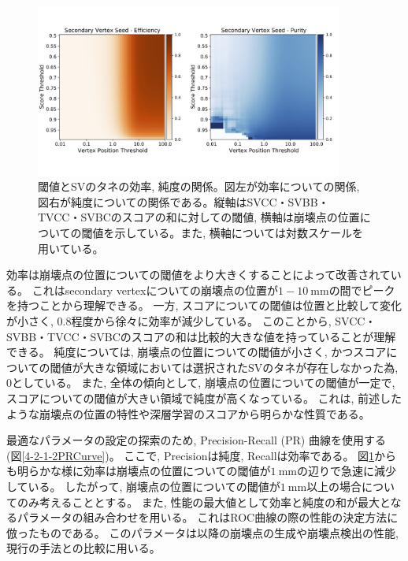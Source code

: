 \begin{figure}[htbp]
 \centering
 \includegraphics[width=0.9\textwidth, clip]{Figure/4VertexFinderwithDL/4-2-1-1SVSeed.png}
 \caption[閾値とSVのタネの効率, 純度の関係]{閾値とSVのタネの効率, 純度の関係。図左が効率についての関係, 図右が純度についての関係である。縦軸はSVCC・SVBB・TVCC・SVBCのスコアの和に対しての閾値, 横軸は崩壊点の位置についての閾値を示している。また, 横軸については対数スケールを用いている。}
 \label{4-2-1-1SVSeed}
\end{figure}

効率は崩壊点の位置についての閾値をより大きくすることによって改善されている。
これはsecondary vertexについての崩壊点の位置が$1-10\ \mathrm{mm}$の間でピークを持つことから理解できる。
一方, スコアについての閾値は位置と比較して変化が小さく, $0.8$程度から徐々に効率が減少している。
このことから, SVCC・SVBB・TVCC・SVBCのスコアの和は比較的大きな値を持っていることが理解できる。
純度については, 崩壊点の位置についての閾値が小さく, かつスコアについての閾値が大きな領域においては選択されたSVのタネが存在しなかった為, $0$としている。
また, 全体の傾向として, 崩壊点の位置についての閾値が一定で, スコアについての閾値が大きい領域で純度が高くなっている。
これは, 前述したような崩壊点の位置の特性や深層学習のスコアから明らかな性質である。

最適なパラメータの設定の探索のため, Precision-Recall (PR) 曲線を使用する (図\ref{4-2-1-2PRCurve})。
ここで, Precisionは純度, Recallは効率である。
図\ref{4-2-1-1SVSeed}からも明らかな様に効率は崩壊点の位置についての閾値が$1\ \mathrm{mm}$の辺りで急速に減少している。
したがって, 崩壊点の位置についての閾値が$1\ \mathrm{mm}$以上の場合についてのみ考えることとする。
また, 性能の最大値として効率と純度の和が最大となるパラメータの組み合わせを用いる。
これはROC曲線の際の性能の決定方法に倣ったものである。
このパラメータは以降の崩壊点の生成や崩壊点検出の性能, 現行の手法との比較に用いる。

